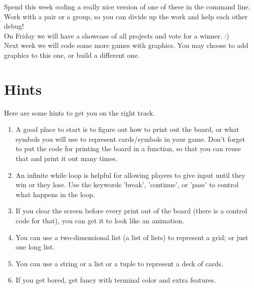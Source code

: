 \documentclass{42-en}
\begin{document}
Spend this week coding a really nice version of one of these in the command line. Work with a pair or a group, so you can divide up the work and help each other debug!\\

On Friday we will have a showcase of all projects and vote for a winner. :)\\

Next week we will code some more games with graphics. You may choose to add graphics to this one, or build a different one.


\chapter{Hints}

Here are some hints to get you on the right track.

\begin{enumerate}

	\item A good place to start is to figure out how to print out the board, or what symbols you will use to represent cards/symbols in your game. Don't forget to put the code for printing the board in a function, so that you can reuse that and print it out many times.

	\item An infinite while loop is helpful for allowing players to give input until they win or they lose. Use the keywords 'break', 'continue', or 'pass' to control what happens in the loop.

	\item If you clear the screen before every print out of the board (there is a control code for that), you can get it to look like an animation.

	\item You can use a two-dimensional list (a list of lists) to represent a grid; or just one long list.

	\item You can use a string or a list or a tuple to represent a deck of cards.

	\item If you get bored, get fancy with terminal color and extra features.

\end{enumerate}
\end{document}
